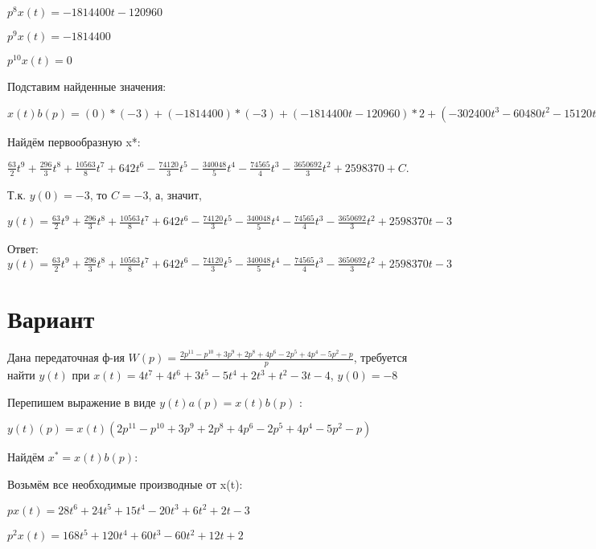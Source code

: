 \documentclass{article}
\begin{document}
{{{$p^8x(t)=-1814400t-120960$

$p^9x(t)=-1814400$

$p^10x(t)=0$

Подставим найденные значения:

$x(t)b(p) = (0)*(-3)+(-1814400)*(-3)+(-1814400t-120960)*2+(-302400t^{3}-60480t^{2}-15120t-3600)*1+(-75600t^{4}-20160t^{3}-7560t^{2}-3600t-480)*2+(-2520t^{6}-1008t^{5}-630t^{4}-600t^{3}-240t^{2}-96t+6)*(-4)+(-360t^{7}-168t^{6}-126t^{5}-150t^{4}-80t^{3}-48t^{2}+6t-8)*(-2)+(-45t^{8}-24t^{7}-21t^{6}-30t^{5}-20t^{4}-16t^{3}+3t^{2}-8t-4)*(-3)+(-45t^{8}-24t^{7}-21t^{6}-30t^{5}-20t^{4}-16t^{3}+3t^{2}-8t-4)*(-4)=315t^{8}+888t^{7}+10563t^{6}+4494t^{5}-148240t^{4}-340048t^{3}-74565t^{2}-3650692t$





Найдём первообразную x*:

$\frac{63}{2}t^{9}+\frac{296}{3}t^{8}+\frac{10563}{8}t^{7}+642t^{6}-\frac{74120}{3}t^{5}-\frac{340048}{5}t^{4}-\frac{74565}{4}t^{3}-\frac{3650692}{3}t^{2}+2598370+C.$

Т.к. $y(0)=-3$, то $C=-3$, а, значит, 

$y(t)=\frac{63}{2}t^{9}+\frac{296}{3}t^{8}+\frac{10563}{8}t^{7}+642t^{6}-\frac{74120}{3}t^{5}-\frac{340048}{5}t^{4}-\frac{74565}{4}t^{3}-\frac{3650692}{3}t^{2}+2598370t-3$

Ответ: $y(t) = \frac{63}{2}t^{9}+\frac{296}{3}t^{8}+\frac{10563}{8}t^{7}+642t^{6}-\frac{74120}{3}t^{5}-\frac{340048}{5}t^{4}-\frac{74565}{4}t^{3}-\frac{3650692}{3}t^{2}+2598370t-3$

\section{Вариант}

Дана передаточная ф-ия $W(p)=\frac{2p^{11}-p^{10}+3p^{9}+2p^{8}+4p^{6}-2p^{5}+4p^{4}-5p^{2}-p}{p}$, требуется найти $y(t)$ при $x(t)=4t^{7}+4t^{6}+3t^{5}-5t^{4}+2t^{3}+t^{2}-3t-4$, $y(0)=-8$

Перепишем выражение в виде $y(t)a(p)=x(t)b(p)$ :

$y(t)(p)=x(t)(2p^{11}-p^{10}+3p^{9}+2p^{8}+4p^{6}-2p^{5}+4p^{4}-5p^{2}-p)$

Найдём $x^*=x(t)b(p)$:

Возьмём все необходимые производные от x(t):

$px(t)=28t^{6}+24t^{5}+15t^{4}-20t^{3}+6t^{2}+2t-3$

$p^2x(t)=168t^{5}+120t^{4}+60t^{3}-60t^{2}+12t+2$

}}}
\end{document}
